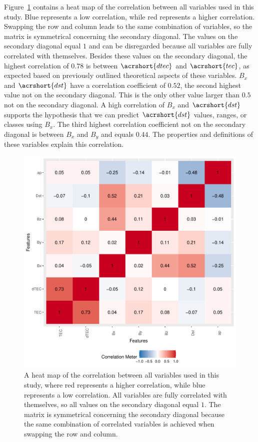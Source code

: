 \documentclass[sn-mathphys-num]{sn-jnl}%
\begin{document}
Figure~\ref{fig:correlation} contains a heat map of the correlation between all variables used in this study. Blue represents a low correlation, while red represents a higher correlation. Swapping the row and column leads to the same combination of variables, so the matrix is symmetrical concerning the secondary diagonal. The values on the secondary diagonal equal $1$ and can be disregarded because all variables are fully correlated with themselves. Besides these values on the secondary diagonal, the highest correlation of $0.78$ is between $\acrshort{dtec}$ and $\acrshort{tec}$, as expected based on previously outlined theoretical aspects of these variables. $B_{x}$ and $\acrshort{dst}$ have a correlation coefficient of $0.52$, the second highest value not on the secondary diagonal. This is the only other value larger than $0.5$ not on the secondary diagonal. A high correlation of $B_{x}$ and $\acrshort{dst}$ supports the hypothesis that we can predict $\acrshort{dst}$ values, ranges, or classes using $B_{x}$. The third highest correlation coefficient not on the secondary diagonal is between $B_{x}$ and $B_{y}$ and equals $0.44$. The properties and definitions of these variables explain this correlation.

\begin{figure}
 \centering
 \includegraphics[width=0.9\linewidth]{correlation.pdf}
    \caption{A heat map of the correlation between all variables used in this study, where red represents a higher correlation, while blue represents a low correlation. All variables are fully correlated with themselves, so all values on the secondary diagonal equal $1$. The matrix is symmetrical concerning the secondary diagonal because the same combination of correlated variables is achieved when swapping the row and column.}
    \label{fig:correlation}
\end{figure}
\end{document}
